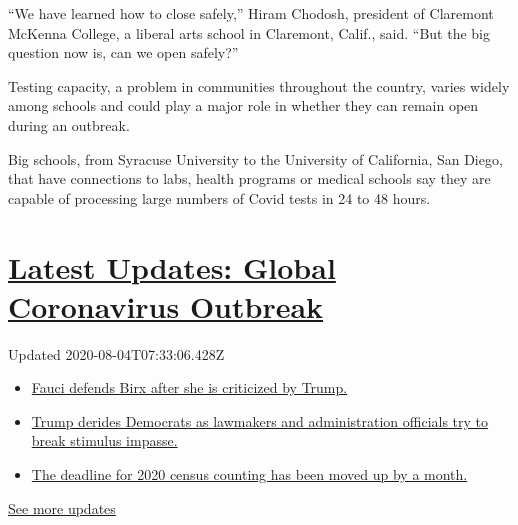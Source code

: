 ``We have learned how to close safely,'' Hiram Chodosh, president of
Claremont McKenna College, a liberal arts school in Claremont, Calif.,
said. ``But the big question now is, can we open safely?''

Testing capacity, a problem in communities throughout the country,
varies widely among schools and could play a major role in whether they
can remain open during an outbreak.

Big schools, from Syracuse University to the University of California,
San Diego, that have connections to labs, health programs or medical
schools say they are capable of processing large numbers of Covid tests
in 24 to 48 hours.

\hypertarget{latest-updates-global-coronavirus-outbreak}{%
\section{\texorpdfstring{\href{https://www.nytimes3xbfgragh.onion/2020/08/03/world/coronavirus-covid-19.html?action=click\&pgtype=Article\&state=default\&region=MAIN_CONTENT_1\&context=storylines_live_updates}{Latest
Updates: Global Coronavirus
Outbreak}}{Latest Updates: Global Coronavirus Outbreak}}\label{latest-updates-global-coronavirus-outbreak}}

Updated 2020-08-04T07:33:06.428Z

\begin{itemize}
\tightlist
\item
  \href{https://www.nytimes3xbfgragh.onion/2020/08/03/world/coronavirus-covid-19.html?action=click\&pgtype=Article\&state=default\&region=MAIN_CONTENT_1\&context=storylines_live_updates\#link-4547638f}{Fauci
  defends Birx after she is criticized by Trump.}
\item
  \href{https://www.nytimes3xbfgragh.onion/2020/08/03/world/coronavirus-covid-19.html?action=click\&pgtype=Article\&state=default\&region=MAIN_CONTENT_1\&context=storylines_live_updates\#link-15e7f995}{Trump
  derides Democrats as lawmakers and administration officials try to
  break stimulus impasse.}
\item
  \href{https://www.nytimes3xbfgragh.onion/2020/08/03/world/coronavirus-covid-19.html?action=click\&pgtype=Article\&state=default\&region=MAIN_CONTENT_1\&context=storylines_live_updates\#link-e5a2cda}{The
  deadline for 2020 census counting has been moved up by a month.}
\end{itemize}

\href{https://www.nytimes3xbfgragh.onion/2020/08/03/world/coronavirus-covid-19.html?action=click\&pgtype=Article\&state=default\&region=MAIN_CONTENT_1\&context=storylines_live_updates}{See
more updates}


